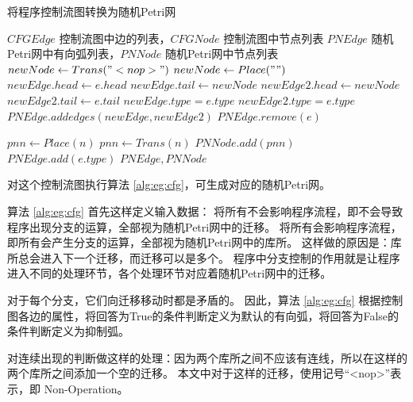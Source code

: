 \begin{algorithm}[!hbt]
\caption{将程序控制流图转换为随机Petri网} \label{alg:eg:cfg}
\begin{algorithmic}[1] %
  \Require $CFGEdge$ 控制流图中边的列表，$CFGNode$ 控制流图中节点列表
  \Ensure $PNEdge$ 随机Petri网中有向弧列表，$PNNode$ 随机Petri网中节点列表
            \State $newNode \gets Trans("<nop>")$
          \Else
            \State $newNode \gets Place("")$
          \EndIf
          \State $newEdge.head \gets e.head$
          \State $newEdge.tail \gets newNode$
          \State $newEdge2.head \gets newNode$
          \State $newEdge2.tail \gets e.tail$
            \State $newEdge.type = e.type$
          \Else
            \State $newEdge2.type = e.type$
          \EndIf
          \State $PNEdge.addedges(newEdge, newEdge2)$
          \State $PNEdge.remove(e)$
        \EndIf
      \EndFor
    \EndFunction

          \State $pnn \gets Place(n)$
        \Else
          \State $pnn \gets Trans(n)$
        \EndIf
        \State $PNNode.add(pnn)$
      \EndFor
        \State $PNEdge.add(e.type)$
      \EndFor
      \State {}
      \State \Return $PNEdge, PNNode$
    \EndFunction
\end{algorithmic}
\end{algorithm}

对这个控制流图执行算法 \ref{alg:eg:cfg}，可生成对应的随机Petri网。

算法 \ref{alg:eg:cfg} 首先这样定义输入数据：
将所有不会影响程序流程，即不会导致程序出现分支的运算，全部视为随机Petri网中的迁移。
将所有会影响程序流程，即所有会产生分支的运算，全部视为随机Petri网中的库所。
这样做的原因是：库所总会进入下一个迁移，而迁移可以是多个。
程序中分支控制的作用就是让程序进入不同的处理环节，各个处理环节对应着随机Petri网中的迁移。

对于每个分支，它们向迁移移动时都是矛盾的。
因此，算法 \ref{alg:eg:cfg} 根据控制图各边的属性，将回答为True的条件判断定义为默认的有向弧，将回答为False的条件判断定义为抑制弧。

对连续出现的判断做这样的处理：因为两个库所之间不应该有连线，所以在这样的两个库所之间添加一个空的迁移。
本文中对于这样的迁移，使用记号“<nop>”表示，即 Non-Operation。

